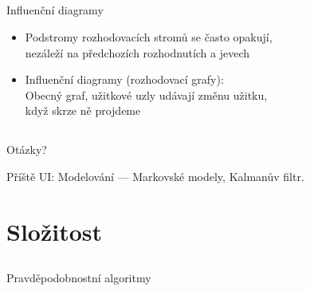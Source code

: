 \documentclass{beamer}
\begin{document}
\subsection{}
\begin{frame}{Influenční diagramy}
\begin{itemize}
\item Podstromy rozhodovacích stromů se často opakují, \\ nezáleží na předchozích rozhodnutích a jevech
\item Influenční diagramy (rozhodovací grafy): \\ Obecný graf, užitkové uzly udávají změnu užitku, \\ když skrze ně projdeme
\end{itemize}
\end{frame}

\subsection{}
\begin{frame}{Otázky?}
\begin{center}
Příště UI: Modelování --- Markovské modely, Kalmanův filtr.
\end{center}
\end{frame}

\section{Složitost}

\subsection{}
\begin{frame}{Pravděpodobnostní algoritmy}
\end{frame}
\end{document}
